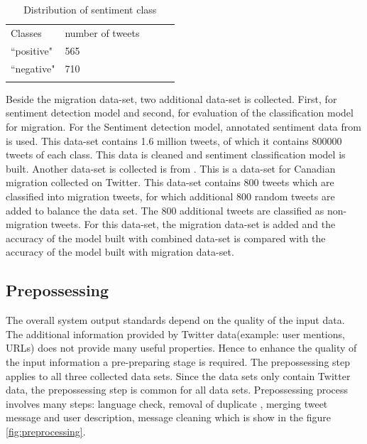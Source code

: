 \begin{table}[]
\centering
\begin{tabular}{lllll}
\cline{1-2}
\multicolumn{1}{|l|}{Classes}   & \multicolumn{1}{l|}{number of tweets} &  &  &  \\ \cline{1-2}
\multicolumn{1}{|l|}{``positive"} & \multicolumn{1}{l|}{565}  &  &  &  \\ \cline{1-2}
\multicolumn{1}{|l|}{``negative"}   & \multicolumn{1}{l|}{710}  &  &  &  \\ \cline{1-2}
                            &                           &  &  & 
\label{tab:Distribution of sentiment class}
\end{tabular}
\caption{Distribution of sentiment class}
\label{tab:DistsentimentClass}
\end{table}

Beside the migration data-set, two additional data-set is collected. First, for sentiment detection model and second, for evaluation of the classification model for migration. For the Sentiment detection model, annotated sentiment data from \cite{stanford_data} is used. This data-set contains 1.6 million tweets, of which it contains  800000 tweets of each class. This data is cleaned and sentiment classification model is built. Another data-set is collected is from \cite{CanadianmMigrationDataset}. This is a data-set for Canadian migration collected on Twitter. This data-set contains 800 tweets which are classified into migration tweets, for which additional 800 random tweets are added to balance the data set. The 800 additional tweets are classified as non-migration tweets. For this data-set, the migration data-set is added and the accuracy of the model built with combined data-set is compared with the accuracy of the model built with migration data-set. 



\subsection{Prepossessing} \label{preprocessing}
The overall system output standards depend on the quality of the input data. The additional information provided by Twitter data(example: user mentions, URLs) does not provide many useful properties. Hence to enhance the quality  of the input information a pre-preparing stage is required. The prepossessing step applies to all three collected data sets. Since the data sets only contain Twitter data, the prepossessing step is common for all data sets. Prepossessing process involves many steps: language check, removal of duplicate , merging tweet message and user description, message cleaning which is show in the figure \ref{fig:preprocessing}. 

